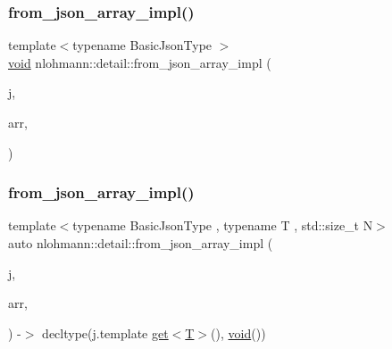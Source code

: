 \mbox{\label{namespacenlohmann_1_1detail_a40f7bb070a60e8ba14fffb9c117fcbd8}} 
\subsubsection{\texorpdfstring{from\_json\_array\_impl()}{from\_json\_array\_impl()}\hspace{0.1cm}{\footnotesize\ttfamily [1/4]}}
{\footnotesize\ttfamily template$<$typename Basic\+Json\+Type $>$ \\
\mbox{\hyperlink{namespacenlohmann_1_1detail_a59fca69799f6b9e366710cb9043aa77d}{void}} nlohmann\+::detail\+::from\+\_\+json\+\_\+array\+\_\+impl (\begin{DoxyParamCaption}\item[{const Basic\+Json\+Type \&}]{j,  }\item[{typename Basic\+Json\+Type\+::array\+\_\+t \&}]{arr,  }\item[{\mbox{\hyperlink{structnlohmann_1_1detail_1_1priority__tag}{priority\+\_\+tag}}$<$ 3 $>$}]{ }\end{DoxyParamCaption})}

\mbox{\label{namespacenlohmann_1_1detail_aba0ce45ebb69fd2c7132a00f9a56b503}} 
\subsubsection{\texorpdfstring{from\_json\_array\_impl()}{from\_json\_array\_impl()}\hspace{0.1cm}{\footnotesize\ttfamily [2/4]}}
{\footnotesize\ttfamily template$<$typename Basic\+Json\+Type , typename T , std\+::size\+\_\+t N$>$ \\
auto nlohmann\+::detail\+::from\+\_\+json\+\_\+array\+\_\+impl (\begin{DoxyParamCaption}\item[{const Basic\+Json\+Type \&}]{j,  }\item[{\mbox{\hyperlink{namespacenlohmann_1_1detail_a1ed8fc6239da25abcaf681d30ace4985af1f713c9e000f5d3f280adbd124df4f5}{std\+::array}}$<$ \mbox{\hyperlink{_keyboard_event_8h_adf1f3edb9115acb0a1e04209b7a9937b}{T}}, \mbox{\hyperlink{_keyboard_event_8h_a8cc2e7240164328fdc3f0e5e21032c56}{N}} $>$ \&}]{arr,  }\item[{\mbox{\hyperlink{structnlohmann_1_1detail_1_1priority__tag}{priority\+\_\+tag}}$<$ 2 $>$}]{ }\end{DoxyParamCaption}) -\/$>$ decltype(j.\+template \mbox{\hyperlink{namespacenlohmann_1_1detail_acc422c11342b31368f610b6f96fcedc6}{get}}$<$\mbox{\hyperlink{_keyboard_event_8h_adf1f3edb9115acb0a1e04209b7a9937b}{T}}$>$(), \mbox{\hyperlink{namespacenlohmann_1_1detail_a59fca69799f6b9e366710cb9043aa77d}{void}}())
}

